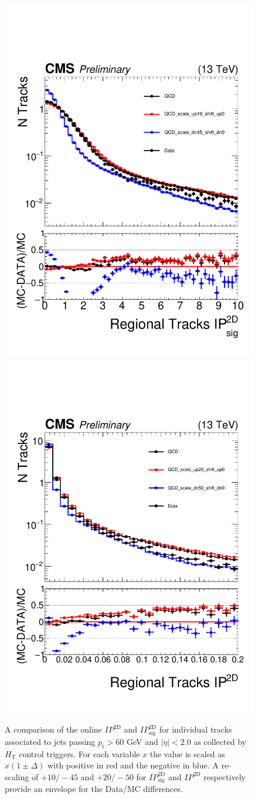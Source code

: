 \begin{figure}
\begin{center}
\includegraphics[width=.45\textwidth]{figures/an/SYSTEMATICS/REGIONAL_SYSTEMATIC/2dipsig_regional_systematic.pdf}
\includegraphics[width=.45\textwidth]{figures/an/SYSTEMATICS/REGIONAL_SYSTEMATIC/2dip_regional_systematic.pdf}
\caption{A comparison of the online $IP^{\textrm{2D}}$ and $IP_{\textrm{sig}}^{\textrm{2D}}$ for individual tracks associated to jets passing $p_{\textrm{t}} > 60$ GeV and $|\eta| <2.0$ as collected by $H_{\textrm{T}}$ control triggers. For each variable $x$ the value is scaled as $x(1\pm\Delta)$ with positive in red and the negative in blue. A re-scaling of $+10/-45$ and $+20/-50$ for
$IP_{\textrm{sig}}^{\textrm{2D}}$ and $IP^{\textrm{2D}}$ respectively
 provide an envelope for the Data/MC differences.  \label{fig:regional_modeling}}
\end{center}
\end{figure}

